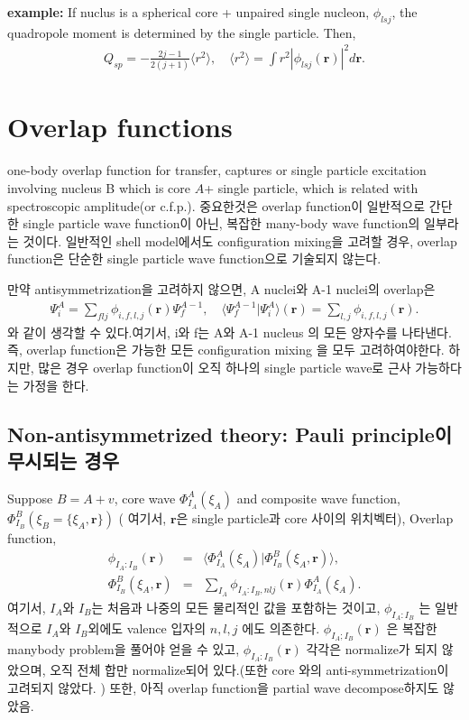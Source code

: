 \documentclass[11pt]{book}
\def\bm{\boldsymbol}
\def\vr{{\bm r}}
\def\la{\langle}
\def\ra{\rangle}
\newcommand{\bea}{\begin{eqnarray}}
\newcommand{\eea}{\end{eqnarray}}
\newcommand{\no}{\nonumber \\}
\begin{document}
{\bf example:} If nuclus is a spherical core + unpaired single nucleon, $\phi_{lsj}$,
the quadropole moment is determined by the single particle. Then,
\bea
Q_{sp}=-\frac{2j-1}{2(j+1)}\la r^2\ra,
\quad \la r^2\ra =\int r^2 |\phi_{lsj}(\vr)|^2 d\vr .
\eea 

\section{Overlap functions}

one-body overlap function for transfer, captures or single particle excitation 
involving nucleus B which is core $A$+ single particle,
which is related with spectroscopic amplitude(or c.f.p.). 
중요한것은 overlap function이 일반적으로 간단한 single particle wave function이 아닌,
복잡한 many-body wave function의 일부라는 것이다. 
일반적인 shell model에서도 configuration mixing을 고려할 경우, overlap function은 단순한 
single particle wave function으로 기술되지 않는다. 

만약 antisymmetrization을 고려하지 않으면, A nuclei와 A-1 nuclei의 overlap은
\bea 
\Psi^A_i=\sum_{flj} \phi_{i,f,l,j}(\vr) \Psi^{A-1}_f,\quad
\la \Psi_f^{A-1}|\Psi_i^A\ra(\vr)=\sum_{l,j}\phi_{i,f,l,j}(\vr).
\eea 
와 같이 생각할 수 있다.여기서, i와 f는 A와 A-1 nucleus 의 모든 양자수를 나타낸다. 
즉, overlap function은 가능한 모든 configuration mixing 을 모두 고려하여야한다. 
하지만, 많은 경우 overlap function이 오직 하나의 single particle wave로 
근사 가능하다는 가정을 한다. 

\subsection{Non-antisymmetrized theory: Pauli principle이 무시되는 경우}





Suppose $B=A+v$, core wave $\Phi_{I_A}^A(\xi_A)$ and composite wave function,
$\Phi^B_{I_B}(\xi_B=\{\xi_A,\vr\})$
( 여기서, $\vr$은 single particle과 
core 사이의 위치벡터),
Overlap function,
\bea 
\phi_{I_A:I_B}(\vr)&=&\la \Phi^A_{I_A}(\xi_A)|\Phi^B_{I_B}(\xi_A,\vr)\ra, \no 
\Phi^B_{I_B}(\xi_A,\vr)&=&\sum_{I_A} \phi_{I_A:I_B,nlj}(\vr)\Phi^A_{I_A}(\xi_A).
\eea 
여기서, $I_A$와 $I_B$는 처음과 나중의 모든 물리적인 값을 포함하는 것이고,
$\phi_{I_A:I_B}$ 는 일반적으로 $I_A$와 $I_B$외에도 valence 입자의 $n,l,j$ 에도
의존한다. 
$\phi_{I_A;I_B}(\vr)$ 은 복잡한 manybody problem을 풀어야 얻을 수 있고, 
$\phi_{I_A:I_B}(\vr)$ 각각은 normalize가 되지 않았으며,
오직 전체 합만 normalize되어 있다.(또한 core 와의 anti-symmetrization이 고려되지 않았다. )
또한, 아직 overlap function을 partial wave decompose하지도 않았음.
\end{document}
